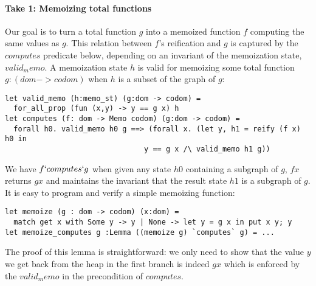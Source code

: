 \documentclass[sigplan,screen]{acmart}\settopmatter{}
\begin{document}
%

\paragraph*{Take 1: Memoizing total functions} Our
goal is to turn a total function \ls$g$ into a memoized
function \ls$f$ computing the same values as \ls$g$.
%
This relation between \ls$f$'s reification and \ls$g$ is captured by
the \ls$computes$ predicate below, depending on an invariant of the
memoization state, \ls$valid_memo$.
%
A memoization state \ls$h$ is valid for memoizing some total
function \ls$g : (dom -> codom)$ when \ls$h$ is a subset of the graph
of \ls$g$:
%
\begin{lstlisting}
let valid_memo (h:memo_st) (g:dom -> codom) = 
  for_all_prop (fun (x,y) -> y == g x) h
let computes (f: dom -> Memo codom) (g:dom -> codom) =
  forall h0. valid_memo h0 g ==> (forall x. (let y, h1 = reify (f x) h0 in 
                                y == g x /\ valid_memo h1 g))
\end{lstlisting}
%
We have \ls$f `computes` g$ when given any state \ls$h0$ containing
a subgraph of \ls$g$, \ls$f x$ returns \ls$g x$ and maintains the
invariant that the result state \ls$h1$ is a subgraph of \ls$g$.
%
It is easy to program and verify a simple memoizing function:
\begin{lstlisting}
let memoize (g : dom -> codom) (x:dom) = 
  match get x with Some y -> y | None -> let y = g x in put x y; y
let memoize_computes g :Lemma ((memoize g) `computes` g) = ...
\end{lstlisting}
%
The proof of this lemma is straightforward: we only need to show that
the value \ls$y$ we get back from the heap in the first branch is
indeed \ls$g x$ which is enforced by the \ls$valid_memo$ in the
precondition of \ls$computes$.
\end{document}
